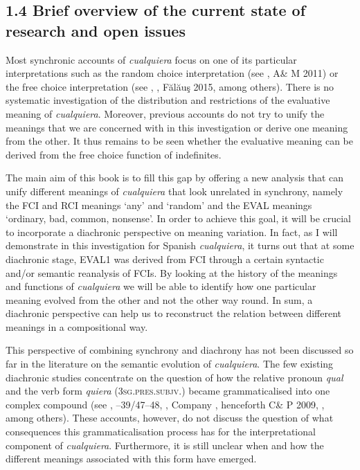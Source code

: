 \documentclass[output=paper]{langscibook}
\begin{document}
\subsection{1.4 Brief overview of the current state of research and open issues}

Most synchronic accounts of \textit{cualquiera} focus on one of its particular interpretations such as the random choice interpretation (see \citealt{ChoiRomero2008}, A\& M 2011) or the free choice interpretation (see \citealt{Menéndez-Benito2010}, \citealt{AloniPort2013}, Fălăuş 2015, among others). There is no systematic investigation of the distribution and restrictions of the evaluative meaning of \textit{cualquiera}. Moreover, previous accounts do not try to unify the meanings that we are concerned with in this investigation or derive one meaning from the other. It thus remains to be seen whether the evaluative meaning can be derived from the free choice function of indefinites.

  The main aim of this book is to fill this gap by offering a new analysis that can unify different meanings of \textit{cualquiera} that look unrelated in synchrony, namely the FCI and RCI meanings ‘any’ and ‘random’ and the EVAL meanings ‘ordinary, bad, common, nonsense’. In order to achieve this goal, it will be crucial to incorporate a diachronic perspective on meaning variation. In fact, as I will demonstrate in this investigation for Spanish \textit{cualquiera}, it turns out that at some diachronic stage, EVAL1 was derived from FCI through a certain syntactic and/or semantic reanalysis of FCIs. By looking at the history of the meanings and functions of \textit{cualquiera} we will be able to identify how one particular meaning evolved from the other and not the other way round. In sum, a diachronic perspective can help us to reconstruct the relation between different meanings in a compositional way.

  This perspective of combining synchrony and diachrony has not been discussed so far in the literature on the semantic evolution of \textit{cualquiera}. The few existing diachronic studies concentrate on the question of how the relative pronoun \textit{qual} and the verb form \textit{quiera} (3\textsc{sg.pres.subjv.}) became grammaticalised into one complex compound (see \citealt{Palomo1934}, \citealt{Lombard1938}–39/47–48, \citealt{Rivero1988}, Company \citealt{CompanyPozas-Loyo2009}, henceforth C\& P 2009, \citealt{Mackenzie2019}, among others). These accounts, however, do not discuss the question of what consequences this grammaticalisation process has for the interpretational component of \textit{cualquiera}. Furthermore, it is still unclear when and how the different meanings associated with this form have emerged.
\end{document}
